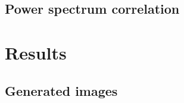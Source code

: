 \documentclass[twocolumn]{article}
\numberwithin{equation}{section}
\begin{document}
\subsection{Power spectrum correlation}



\section{Results}\label{sec:results}



\subsection{Generated images}
\end{document}
